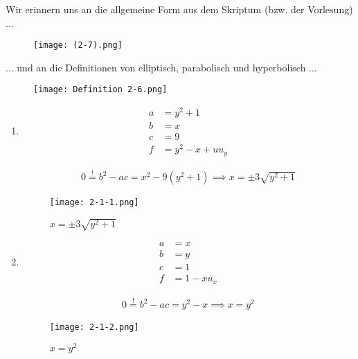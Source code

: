 \begin{solution}

Wir erinnern uns an die allgemeine Form aus dem Skriptum (bzw. der Vorlesung) ...

\begin{figure}[h!]
    \centering
    \texttt{[image: (2-7).png]}
\end{figure}

... und an die Definitionen von elliptisch, parabolisch und hyperbolisch ...

\begin{figure}[h!]
    \centering
    \texttt{[image: Definition 2-6.png]}
\end{figure}

\begin{enumerate}[label = (\roman*)]

    \item

    \begin{align*}
        a & = y^2 + 1 \\
        b & = x \\
        c & = 9 \\
        f & = y^2 - x + u u_y
    \end{align*}

    \begin{align*}
        0 \stackrel{!}{=}
        b^2 - ac
        =
        x^2 - 9 (y^2 + 1)
        \implies
        x = \pm 3 \sqrt{y^2 + 1}
    \end{align*}

    \begin{figure}[h!]
        \centering
        \texttt{[image: 2-1-1.png]}
        \caption{$x = \pm 3 \sqrt{y^2 + 1}$}
    \end{figure}

    \item

    \begin{align*}
        a & = x \\
        b & = y \\
        c & = 1 \\
        f & = 1 - x u_x
    \end{align*}

    \begin{align*}
        0 \stackrel{!}{=}
        b^2 - ac
        =
        y^2 - x
        \implies
        x = y^2
    \end{align*}

    \begin{figure}[h!]
        \centering
        \texttt{[image: 2-1-2.png]}
        \caption{$x = y^2$}
    \end{figure}


\end{enumerate}
\end{solution}
